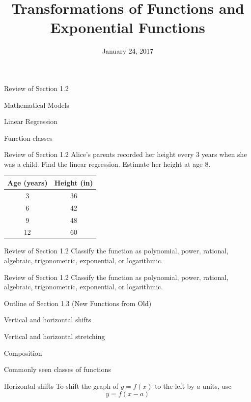 \documentclass[t]{beamer}
\title{Transformations of Functions and \\
Exponential Functions}
\date{January 24, 2017}
\newenvironment{fpi}
  {\itemize[nolistsep,itemsep=\fill]}
  {\vfill\enditemize}
\begin{document}
\frame{\titlepage}


\begin{frame}{Review of Section 1.2}
\begin{fpi}
\item Mathematical Models
\item Linear Regression
\item Function classes
\end{fpi}
\end{frame}

\begin{frame}{Review of Section 1.2}
Alice's parents recorded her height every 3 years when she was a child.
Find the linear regression.  Estimate her height at age 8.
\begin{table}
\begin{tabular}{c c}
Age (years) & Height (in) \\
\hline
3 & 36 \\
6 & 42 \\
9  & 48 \\
12 & 60
\end{tabular}
\end{table}

\end{frame}

\begin{frame}{Review of Section 1.2}
Classify the function as polynomial, power, rational, algebraic, trigonometric, exponential, or logarithmic.
\end{frame}

\begin{frame}{Review of Section 1.2}
Classify the function as polynomial, power, rational, algebraic, trigonometric, exponential, or logarithmic.
\end{frame}

\begin{frame}{Outline of Section 1.3 (New Functions from Old)}
\begin{fpi}
\item Vertical and horizontal shifts
\item Vertical and horizontal stretching
\item Composition
\item Commonly seen classes of functions
\end{fpi}
\end{frame}

\begin{frame}{Horizontal shifts}
To shift the graph of $y = f(x)$ to the left by $a$ units, use
$$y = f(x - a)$$
\end{frame}
\end{document}
